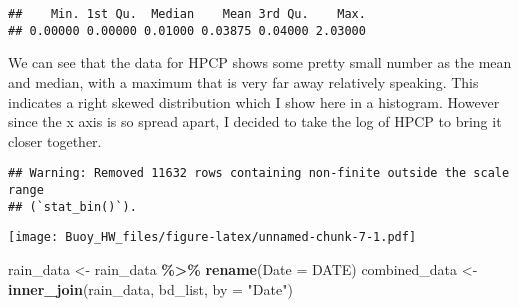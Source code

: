 \documentclass[
]{article}
\newenvironment{Shaded}{\begin{snugshade}}{\end{snugshade}}
\newcommand{\AttributeTok}[1]{\textcolor[rgb]{0.13,0.29,0.53}{#1}}
\newcommand{\DecValTok}[1]{\textcolor[rgb]{0.00,0.00,0.81}{#1}}
\newcommand{\FunctionTok}[1]{\textcolor[rgb]{0.13,0.29,0.53}{\textbf{#1}}}
\newcommand{\NormalTok}[1]{#1}
\newcommand{\OtherTok}[1]{\textcolor[rgb]{0.56,0.35,0.01}{#1}}
\newcommand{\SpecialCharTok}[1]{\textcolor[rgb]{0.81,0.36,0.00}{\textbf{#1}}}
\newcommand{\StringTok}[1]{\textcolor[rgb]{0.31,0.60,0.02}{#1}}
\begin{document}
\begin{verbatim}
##    Min. 1st Qu.  Median    Mean 3rd Qu.    Max. 
## 0.00000 0.00000 0.01000 0.03875 0.04000 2.03000
\end{verbatim}

We can see that the data for HPCP shows some pretty small number as the
mean and median, with a maximum that is very far away relatively
speaking. This indicates a right skewed distribution which I show here
in a histogram. However since the x axis is so spread apart, I decided
to take the log of HPCP to bring it closer together.

\begin{Shaded}
\end{Shaded}

\begin{verbatim}
## Warning: Removed 11632 rows containing non-finite outside the scale range
## (`stat_bin()`).
\end{verbatim}

\texttt{[image: Buoy\_HW\_files/figure-latex/unnamed-chunk-7-1.pdf]}

\begin{Shaded}
\begin{Highlighting}[]
\NormalTok{rain\_data }\OtherTok{\textless{}{-}}\NormalTok{ rain\_data }\SpecialCharTok{\%\textgreater{}\%} \FunctionTok{rename}\NormalTok{(}\AttributeTok{Date =}\NormalTok{ DATE)}
\NormalTok{combined\_data }\OtherTok{\textless{}{-}} \FunctionTok{inner\_join}\NormalTok{(rain\_data, bd\_list, }\AttributeTok{by =} \StringTok{"Date"}\NormalTok{)}
\end{Highlighting}
\end{Shaded}
\end{document}

